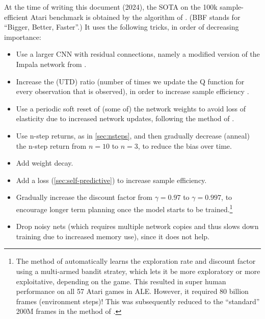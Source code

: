 At the time of writing this document (2024),
the SOTA on the 100k sample-efficient
Atari benchmark
\citep{Atari100k}
is obtained by the  algorithm of \citep{BBF}.
(BBF stands for ``Bigger, Better, Faster''.)
It uses the following tricks,
in order of decreasing importance:
\begin{itemize}



\item Use a larger CNN with residual connections,
  namely a modified version of the Impala
  network from \citep{Espeholt2018}.

  \item Increase the  (UTD)
  ratio
  (number of times we update the Q function
  for every observation that is observed), in order to increase
  sample efficiency
  \citep{VanHasselt2019}.


\item Use a periodic soft reset of (some of) the network weights
to avoid loss of elasticity due to increased network updates, following the
 method of \citep{DOro2022}.


\item Use n-step returns, as in \cref{sec:nsteps},
  and then gradually decrease (anneal) the n-step return from
 $n=10$ to $n=3$,
to reduce the bias over time.


\item Add weight decay.

\item Add a  loss
  (\cref{sec:self-predictive})
 to increase sample efficiency.

\item  Gradually increase the discount factor from
  $\gamma=0.97$ to $\gamma=0.997$,
  to encourage longer term planning once the model starts to be trained.\footnote{
    The  method of  \citep{Badia2020}
  automatically learns the exploration rate and discount factor
  using a multi-armed bandit stratey,
  which lets it  be more exploratory or more exploitative,
  depending on the game. This resulted in super human performance
  on all 57 Atari games in ALE.
  However, it required 80 billion frames (environment steps)!
  This was subsequently reduced to the ``standard''
  200M frames in the  method of \citep{Kapturowski2022}.
  }


\item Drop noisy nets (which requires multiple network copies and thus slows
  down training due to increased memory use), since it does not help.


\end{itemize}
